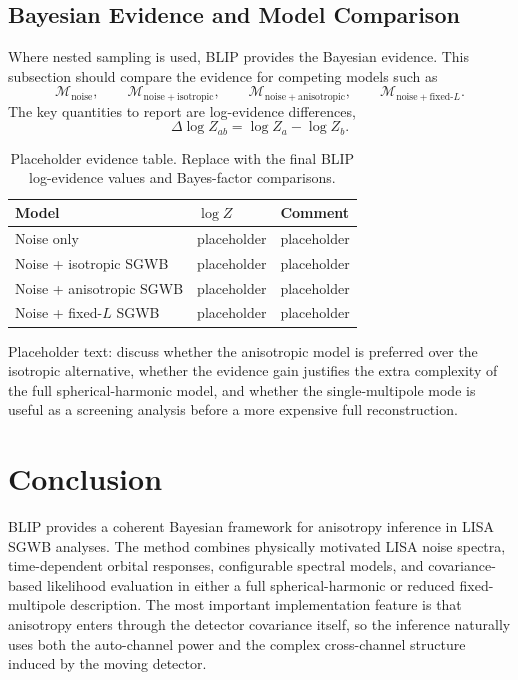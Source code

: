 \documentclass[11pt]{article}
\begin{document}
\subsection{Bayesian Evidence and Model Comparison}
Where nested sampling is used, BLIP provides the Bayesian evidence. This subsection should compare the evidence for competing models such as
\begin{equation}
\mathcal{M}_{\mathrm{noise}}, \qquad
\mathcal{M}_{\mathrm{noise+isotropic}}, \qquad
\mathcal{M}_{\mathrm{noise+anisotropic}}, \qquad
\mathcal{M}_{\mathrm{noise+fixed}\text{-}L}.
\end{equation}
The key quantities to report are log-evidence differences,
\begin{equation}
\Delta \log Z_{ab}=\log Z_a-\log Z_b.
\end{equation}

\begin{table}[H]
\centering
\caption{Placeholder evidence table. Replace with the final BLIP log-evidence values and Bayes-factor comparisons.}
\label{tab:evidence}
\begin{tabular}{lll}
\toprule
Model & $\log Z$ & Comment \\
\midrule
Noise only & placeholder & placeholder \\
Noise + isotropic SGWB & placeholder & placeholder \\
Noise + anisotropic SGWB & placeholder & placeholder \\
Noise + fixed-$L$ SGWB & placeholder & placeholder \\
\bottomrule
\end{tabular}
\end{table}

Placeholder text: discuss whether the anisotropic model is preferred over the isotropic alternative, whether the evidence gain justifies the extra complexity of the full spherical-harmonic model, and whether the single-multipole mode is useful as a screening analysis before a more expensive full reconstruction.

\section{Conclusion}
BLIP provides a coherent Bayesian framework for anisotropy inference in LISA SGWB analyses. The method combines physically motivated LISA noise spectra, time-dependent orbital responses, configurable spectral models, and covariance-based likelihood evaluation in either a full spherical-harmonic or reduced fixed-multipole description. The most important implementation feature is that anisotropy enters through the detector covariance itself, so the inference naturally uses both the auto-channel power and the complex cross-channel structure induced by the moving detector.
\end{document}
